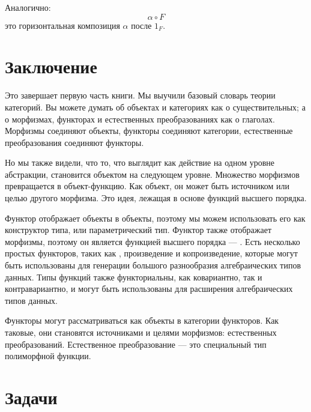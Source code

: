 Аналогично:
\[\alpha \circ F\]
это горизонтальная композиция $\alpha$ после $1_F$.

\section{Заключение}

Это завершает первую часть книги. Мы выучили базовый
словарь теории категорий. Вы можете думать об объектах и категориях
как о существительных; а о морфизмах, функторах и естественных преобразованиях как о глаголах.
Морфизмы соединяют объекты, функторы соединяют категории, естественные
преобразования соединяют функторы.

Но мы также видели, что то, что выглядит как действие на одном уровне
абстракции, становится объектом на следующем уровне. Множество морфизмов
превращается в объект-функцию. Как объект, он может быть источником или
целью другого морфизма. Это идея, лежащая в основе функций высшего
порядка.

Функтор отображает объекты в объекты, поэтому мы можем использовать его как
конструктор типа, или параметрический тип. Функтор также отображает морфизмы, поэтому он
является функцией высшего порядка --- . Есть несколько простых
функторов, таких как , произведение и копроизведение, которые могут быть использованы
для генерации большого разнообразия алгебраических типов данных. Типы функций
также функториальны, как ковариантно, так и контравариантно, и могут быть использованы для
расширения алгебраических типов данных.

Функторы могут рассматриваться как объекты в категории функторов. Как таковые,
они становятся источниками и целями морфизмов: естественных преобразований.
Естественное преобразование --- это специальный тип полиморфной функции.

\section{Задачи}

